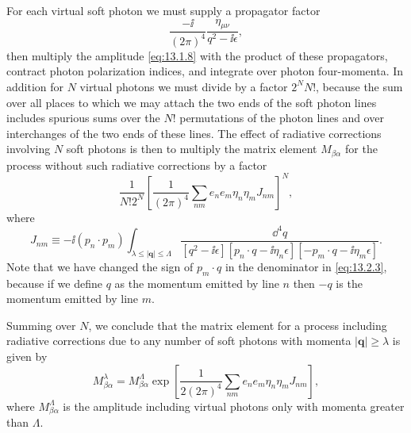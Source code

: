 For each virtual soft photon we must supply a propagator factor
\begin{equation}
  \frac{-\ii}{(2\pi)^4}\frac{\eta_{\mu\nu}}{q^2-\ii\epsilon},
  \tag{13.2.1}\label{eq:13.2.1}
\end{equation}
then multiply the amplitude \eqref{eq:13.1.8} with the product of these
propagators, contract photon polarization indices, and integrate over photon
four-momenta. In addition for $N$ virtual photons we must divide by a factor
$2^N N!$, because the sum over all places to which we may attach the
two ends of the soft photon lines includes spurious sums over the $N!$
permutations of the photon lines and over interchanges of the two ends
of these lines. The effect of radiative corrections involving $N$ soft photons
is then to multiply the matrix element $M_{\beta\alpha}$ for the process without such
radiative corrections by a factor
\begin{equation}
  \frac{1}{N!2^N}
  \left[\frac{1}{(2\pi)^4}\sum_{nm}e_n e_m\eta_n\eta_m J_{nm}\right]^N,
  \tag{13.2.2}\label{eq:13.2.2}
\end{equation}
where
\begin{equation}
  J_{nm}\equiv-\ii(p_n\cdot p_m)
  \int_{\lambda\leq|\mathbf q|\leq\Lambda}
  \frac{\dd^4q}{[q^2-\ii\epsilon][p_n\cdot q-\ii\eta_n\epsilon]
  [-p_m\cdot q-\ii\eta_m\epsilon]}.
  \tag{13.2.3}\label{eq:13.2.3}
\end{equation}
Note that we have changed the sign of $p_m\cdot q$ in the denominator in
\eqref{eq:13.2.3},
because if we define $q$ as the momentum emitted by line $n$ then $-q$ is the
momentum emitted by line $m$.

Summing over $N$, we conclude that the matrix element for a process
including radiative corrections due to any number of soft photons with
momenta $|\mathbf q|\geq\lambda$ is given by
\begin{equation}
  M^\lambda_{\beta\alpha}=M^\Lambda_{\beta\alpha}
  \exp\left[\frac{1}{2(2\pi)^4}
  \sum_{nm}e_n e_m\eta_n\eta_m J_{nm}\right],
  \tag{13.2.4}\label{eq:13.2.4}
\end{equation}
where $M^\Lambda_{\beta\alpha}$ is the amplitude including virtual photons only with momenta
greater than $\Lambda$.

